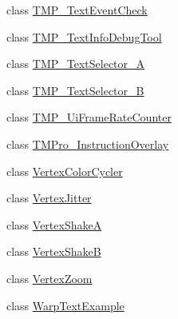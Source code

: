 \begin{DoxyCompactItemize}
\item 
class \hyperlink{classTMPro_1_1Examples_1_1TMP__TextEventCheck}{T\+M\+P\+\_\+\+Text\+Event\+Check}
\item 
class \hyperlink{classTMPro_1_1Examples_1_1TMP__TextInfoDebugTool}{T\+M\+P\+\_\+\+Text\+Info\+Debug\+Tool}
\item 
class \hyperlink{classTMPro_1_1Examples_1_1TMP__TextSelector__A}{T\+M\+P\+\_\+\+Text\+Selector\+\_\+A}
\item 
class \hyperlink{classTMPro_1_1Examples_1_1TMP__TextSelector__B}{T\+M\+P\+\_\+\+Text\+Selector\+\_\+B}
\item 
class \hyperlink{classTMPro_1_1Examples_1_1TMP__UiFrameRateCounter}{T\+M\+P\+\_\+\+Ui\+Frame\+Rate\+Counter}
\item 
class \hyperlink{classTMPro_1_1Examples_1_1TMPro__InstructionOverlay}{T\+M\+Pro\+\_\+\+Instruction\+Overlay}
\item 
class \hyperlink{classTMPro_1_1Examples_1_1VertexColorCycler}{Vertex\+Color\+Cycler}
\item 
class \hyperlink{classTMPro_1_1Examples_1_1VertexJitter}{Vertex\+Jitter}
\item 
class \hyperlink{classTMPro_1_1Examples_1_1VertexShakeA}{Vertex\+ShakeA}
\item 
class \hyperlink{classTMPro_1_1Examples_1_1VertexShakeB}{Vertex\+ShakeB}
\item 
class \hyperlink{classTMPro_1_1Examples_1_1VertexZoom}{Vertex\+Zoom}
\item 
class \hyperlink{classTMPro_1_1Examples_1_1WarpTextExample}{Warp\+Text\+Example}
\end{DoxyCompactItemize}
